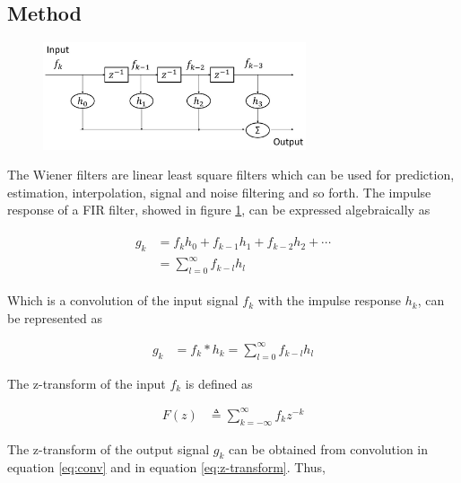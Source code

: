 \documentclass[8pt,a4paper]{article}
\begin{document}
\begin{multicols}{2}
\section*{Method}

\begin{figure}[H]
  \begin{center}
      \includegraphics[width=220pt]{./Figures/fir.jpg}
      \caption{}
      \label{fig:fir_filter}
  \end{center}
\end{figure}

The Wiener filters are linear least square filters which can be used for prediction, estimation, interpolation, signal and noise filtering and so forth.\cite{widrow1987}
The impulse response of a FIR filter, showed in figure \ref{fig:fir_filter}, can be expressed algebraically as 

\begin{align}
  \begin{split}
  g_{k} &= f_{k}h_{0} + f_{k-1}h_{1} + f_{k-2}h_{2} + \cdots \\
        &= \sum_{l=0}^{\infty} f_{k-l}h_{l}
  \end{split}
\end{align}

Which is a convolution of the input signal $f_{k}$ with the impulse response $h_{k}$, can be represented as

\begin{align}
\label{eq:conv}
  g_{k} &= f_{k} * h_{k} 
        = \sum_{l=0}^{\infty} f_{k-l}h_{l} 
\end{align}

The z-transform of the input $f_{k}$ is defined as

\begin{align}
  \label{eq:z-transform}
  F(z)&\triangleq \sum_{k=-\infty}^{\infty} f_{k}z^{-k}
\end{align}

The z-transform of the output signal $g_{k}$ can be obtained from convolution in equation \ref{eq:conv} and in equation \ref{eq:z-transform}. Thus, 


\end{multicols}
\end{document}
